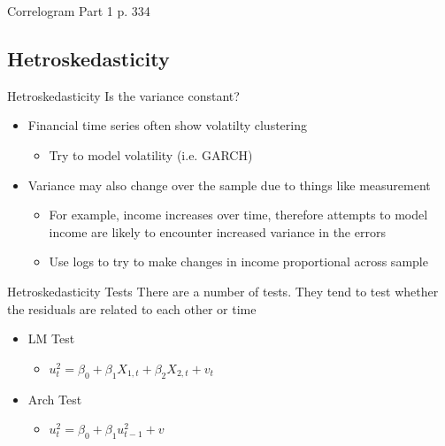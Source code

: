 \documentclass[14pt,xcolor=pdftex,dvipsnames,table]{beamer}\usepackage[]{graphicx}\usepackage[]{color}
\begin{document}
\begin{frame}{Correlogram Part 1 p. 334}
\subsection{Hetroskedasticity}
\begin{frame}{Hetroskedasticity}
Is the variance constant? 
\begin{itemize}[<+-| alert@+>]
\item Financial time series often show volatilty clustering
\begin{itemize}
\item Try to model volatility (i.e. GARCH)
\end{itemize}
\item Variance may also change over the sample due to things like measurement
\begin{itemize}
\item For example, income increases over time, therefore attempts to model income are likely to encounter increased variance in the errors
\item Use logs to try to make changes in income proportional across sample
\end{itemize}
\end{itemize}
\end{frame}

\begin{frame}{Hetroskedasticity Tests}
There are a number of tests.  They tend to test whether the residuals are related to each other or time
\begin{itemize}[<+-| alert@+>]
\item LM Test
\begin{itemize}
\item $u_t^2 = \beta_0 + \beta_1 X_{1, t} + \beta_2 X_{2, t} + v_t$
\end{itemize}
\item Arch Test
\begin{itemize}
\item $u_t^2 = \beta_0 + \beta_1 u_{t-1}^2 + v$
\end{itemize}
\end{itemize}
\end{frame}



\end{frame}
\end{document}
